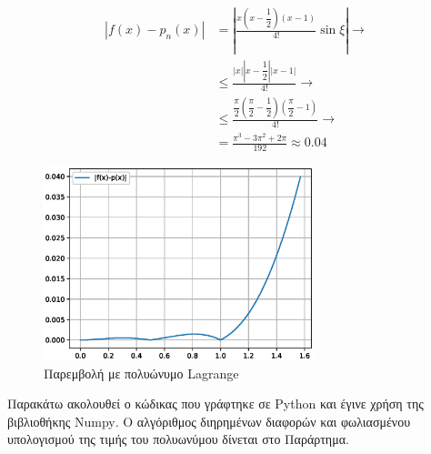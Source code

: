 \documentclass[assignment3.tex]{subfiles}
\begin{document}
\begin{equation}
\begin{split}
|f(x)-p_n(x)|&=\left|\frac{x(x-\dfrac{1}{2})(x-1)}{4!}\sin\xi\right| \rightarrow \\
&\leq \frac{|x||x-\dfrac{1}{2}||x-1|}{4!}\rightarrow \\
& \leq \frac{\dfrac{\pi}{2} (\dfrac{\pi}{2}-\dfrac{1}{2})(\dfrac{\pi}{2}-1)}{4!} \rightarrow \\
&=\frac{\pi^3-3\pi^2+2\pi}{192} \approx 0.04
\end{split}
\label{eq:interpolation_error}
\end{equation}

\begin{figure}[hp]
	\includegraphics[width=0.7\textwidth]{ex2_error.eps}
	\centering
	\caption{Παρεμβολή με πολυώνυμο \textlatin{Lagrange}}
	\label{fig:ex2_error}
\end{figure}

Παρακάτω ακολουθεί ο κώδικας που γράφτηκε σε \textlatin{Python} και έγινε χρήση της βιβλιοθήκης \textlatin{Numpy}. Ο αλγόριθμος διηρημένων διαφορών και φωλιασμένου υπολογισμού της τιμής του πολυωνύμου δίνεται στο Παράρτημα.

\end{document}
